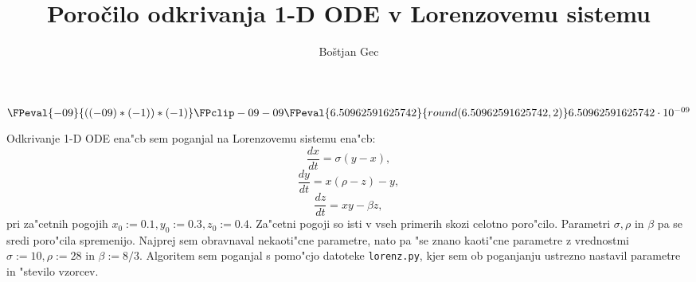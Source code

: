 \documentclass[10pt,a4paper]{article}
\title{Poročilo odkrivanja 1-D ODE v Lorenzovemu sistemu}
\author{Boštjan Gec}
\begin{document}
	\maketitle
    

\newcommand{\round}[2][2]{\( \FPeval{ \p }{round(#2, #1)} \p \)}
\newcommand{\roundNonE}[3][2]{\( \FPeval{ \p }{round(#2 * 10^(#3), #1)} \p\cdot 10^{-#3} \)}
\newcommand{\roundExp}[2][2]{\(
\StrCut{#2}{e}{\coefA}{\order}
\FPeval{\order}{((\order) * (-1))*(-1)} 
\FPclip\order\order  %
\FPeval{\coefA}{round(\coefA, #1)} 
\coefA \cdot 10^{\order}
\)}
\newcommand{\eqiIp}{0.0015054336000000002}
\newcommand{\eqiIpRound}{\round{\eqiIp}{3}{2}}
\newcommand{\eqiiIp}{ 6.50962591625742e-09  }
\roundExp[2]{\eqiiIp}
\newcommand{\eqiiiIp}{0.0004094779392000001}
\newcommand{\eqiiiIpRound}{\round{\eqiiiIp}{4}{2}}




Odkrivanje 1-D ODE ena"cb sem poganjal na Lorenzovemu sistemu ena"cb:
$$
\frac{dx}{dt} = \sigma (y-x),
$$ $$
\frac{dy}{dt} = x(\rho-z) - y,
$$ $$
\frac{dz}{dt} = xy - \beta z,
$$
pri za"cetnih pogojih $x_0:=0.1, y_0:=0.3, z_0:=0.4$.
Za"cetni pogoji so isti v vseh primerih skozi celotno poro"cilo.
Parametri $\sigma, \rho$ in $\beta$ pa se sredi poro"cila
spremenijo. Najprej sem obravnaval nekaoti"cne parametre, nato 
pa "se znano kaoti"cne parametre z vrednostmi
$\sigma:=10, \rho:=28$ in $\beta:=8/3$.
Algoritem sem poganjal s pomo"cjo datoteke \verb|lorenz.py|, kjer sem ob poganjanju
ustrezno nastavil parametre in "stevilo vzorcev.
\end{document}
